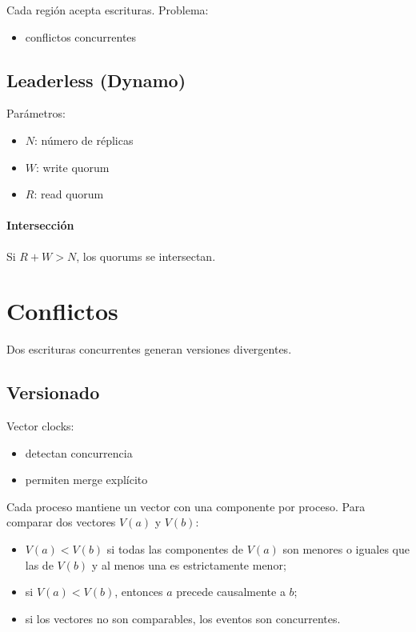 \documentclass[variant=apuntes,cover=institutional,mode=screen]{ua-engineering-v6-article}
\begin{document}
Cada región acepta escrituras. Problema:
\begin{itemize}
\item conflictos concurrentes
\end{itemize}

\subsection{Leaderless (Dynamo)}

Parámetros:
\begin{itemize}
\item $N$: número de réplicas
\item $W$: write quorum
\item $R$: read quorum
\end{itemize}

\paragraph{Intersección}
Si $R+W>N$, los quorums se intersectan.

\section{Conflictos}

Dos escrituras concurrentes generan versiones divergentes.

\subsection{Versionado}

Vector clocks:
\begin{itemize}
\item detectan concurrencia
\item permiten merge explícito
\end{itemize}

Cada proceso mantiene un vector con una componente por proceso. Para comparar dos vectores $V(a)$ y $V(b)$:
\begin{itemize}
\item $V(a) < V(b)$ si todas las componentes de $V(a)$ son menores o iguales que las de $V(b)$ y al menos una es estrictamente menor;
\item si $V(a) < V(b)$, entonces $a$ precede causalmente a $b$;
\item si los vectores no son comparables, los eventos son concurrentes.
\end{itemize}
\end{document}
